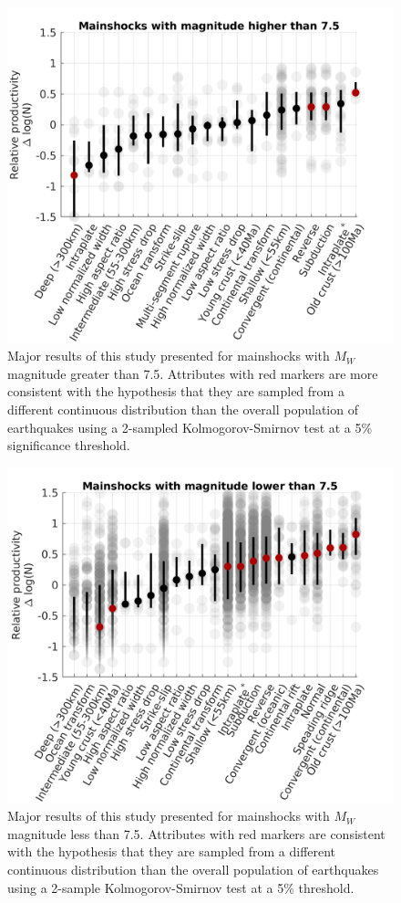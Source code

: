 \documentclass[draft]{agujournal}
\begin{document}
\begin{figure}[H]
\centering
\includegraphics{figures/cal_tech_7plus.png}
\caption{Major results of this study presented for mainshocks with $M_W$ magnitude greater than 7.5. Attributes with red markers are more consistent with the hypothesis that they are sampled from a different continuous distribution than the overall population of earthquakes using a 2-sampled Kolmogorov-Smirnov test at a 5\% significance threshold.}
\label{fig:caltech_sens1}
\end{figure}

\begin{figure}[H]
\centering
\includegraphics{figures/cal_tech_lt7.png}
\caption{Major results of this study presented for mainshocks with $M_W$ magnitude less than 7.5. Attributes with red markers are consistent with the hypothesis that they are sampled from a different continuous distribution than the overall population of earthquakes using a 2-sample Kolmogorov-Smirnov test at a 5\% threshold.}
\label{fig:caltech_sens2}
\end{figure}
\newpage
\end{document}
